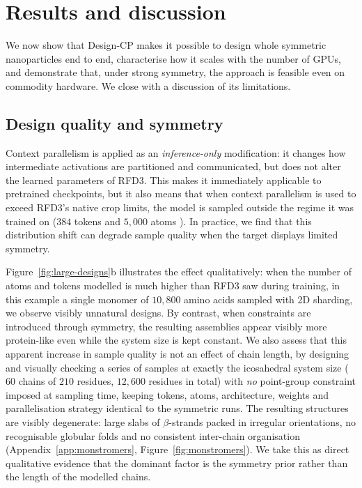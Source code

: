\chapter{Results and discussion}
\label{ch:results}

We now show that Design-CP makes it possible to design whole symmetric
nanoparticles end to end, characterise how it scales with the number of GPUs, and
demonstrate that, under strong symmetry, the approach is feasible even on
commodity hardware. We close with a discussion of its limitations.

\section{Design quality and symmetry}
\label{sec:design-quality}

Context parallelism is applied as an \emph{inference-only} modification: it
changes how intermediate activations are partitioned and communicated, but does
not alter the learned parameters of RFD3. This makes it immediately applicable to
pretrained checkpoints, but it also means that when context parallelism is used to
exceed RFD3's native crop limits, the model is sampled outside the regime it was
trained on ($384$ tokens and $5{,}000$ atoms
\parencite{butcher_novo_2025}). In practice, we find that this distribution shift
can degrade sample quality when the target displays limited symmetry.

Figure~\ref{fig:large-designs}b illustrates the effect qualitatively: when the
number of atoms and tokens modelled is much higher than RFD3 saw during training,
in this example a single monomer of $10{,}800$ amino acids sampled with 2D
sharding, we observe visibly unnatural designs. By contrast, when constraints are
introduced through symmetry, the resulting assemblies appear visibly more
protein-like even while the system size is kept constant. We also assess that this
apparent increase in sample quality is not an effect of chain length, by designing
and visually checking a series of samples at exactly the icosahedral system size
($60$ chains of $210$ residues, $12{,}600$ residues in total) with \emph{no}
point-group constraint imposed at sampling time, keeping tokens, atoms,
architecture, weights and parallelisation strategy identical to the symmetric
runs. The resulting structures are visibly degenerate: large slabs of
$\beta$-strands packed in irregular orientations, no recognisable globular folds
and no consistent inter-chain organisation (Appendix~\ref{app:monstromers},
Figure~\ref{fig:monstromers}). We take this as direct qualitative evidence that
the dominant factor is the symmetry prior rather than the length of the modelled
chains.

